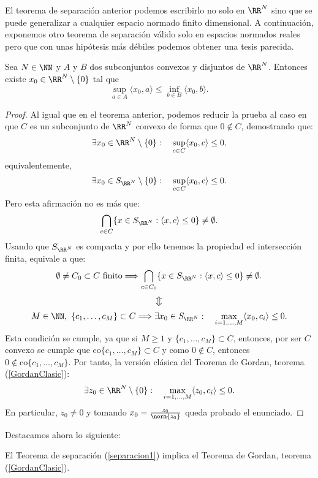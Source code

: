 El teorema de separación anterior podemos escribirlo no solo en $ \RR^N $ sino que se puede generalizar a cualquier espacio normado finito dimensional. A continuación, exponemos otro teorema de separación válido solo en espacios normados reales pero que con unas hipótesis más débiles podemos obtener una tesis parecida.

\begin{teoremaBox}
Sea $ N \in \NN $ y $ A \text{ y } B$ dos subconjuntos convexos y disjuntos de $ \RR^N $. Entonces existe $ x_0 \in \RR^N \setminus \{0\} $ tal que
\[
\sup_{a \in A} \langle x_0,a\rangle \leq \inf_{b\in B} \langle x_0,b\rangle.
\]
\end{teoremaBox}
\begin{proof}
Al igual que en el teorema anterior, podemos reducir la prueba al caso en que $ C $ es un subconjunto de $ \RR^N $ convexo de forma que $ 0 \notin C $, demostrando que:
\[
\exists x_0 \in \RR^N \setminus \{0\}: \quad \sup_{c \in C} \langle x_0, c \rangle \leq 0,
\]
equivalentemente, 
\[
\exists x_0 \in S_{\RR^N} \setminus \{0\}: \quad \sup_{c \in C} \langle x_0, c \rangle \leq 0.
\]
Pero esta afirmación no es más que:
\[
\bigcap_{c \in C} \{x \in S_{\RR^N}: \langle x, c \rangle \leq 0 \} \neq \emptyset.
\]
Usando que $ S_{\RR^N} $ es compacta y por ello tenemos la propiedad ed intersección finita, equivale a que:
\[
\emptyset \neq C_0 \subset C \text{ finito} \Longrightarrow \bigcap_{c \in C_0} \{x \in S_{\RR^N}: \langle x, c \rangle \leq 0 \} \neq \emptyset.
\]
\[
\big\Updownarrow
\]
\[
M \in \NN, \text{ } \{c_1,\dots, c_M\} \subset C\Longrightarrow \exists x_0 \in S_{\RR^N}: \quad \max_{i=1,\dots,M} \langle x_0, c_i \rangle \leq 0.
\]
Esta condición se cumple, ya que si $ M \geq 1 $ y $ \{c_1,\dots, c_M\} \subset C $, entonces, por ser $ C $ convexo se cumple que $ \mathrm{co}\{c_1,\dots, c_M \} \subset C $ y como $ 0 \notin C $, entonces $  0 \notin \mathrm{co}\{c_1,\dots, c_M \} $. Por tanto, la versión clásica del Teorema de Gordan, teorema (\ref{GordanClasic}):
\[
\exists z_0 \in \RR^N \setminus \{0\}: \quad \max_{i=1,\dots,M} \langle z_0, c_i \rangle \leq 0.
\]
En particular, $ z_0 \neq 0 $ y tomando $ x_0 = \frac{z_0}{\norm{z_0}} $ queda probado el enunciado.
\end{proof}

Destacamos ahora lo siguiente:
\begin{observacion}
El Teorema de separación (\ref{separacion1}) implica el Teorema de Gordan, teorema (\ref{GordanClasic}).
\end{observacion}

